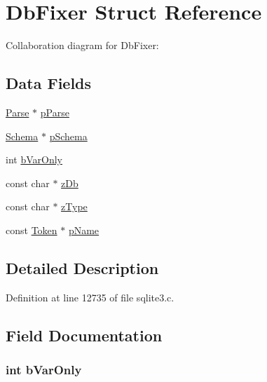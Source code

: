 \hypertarget{struct_db_fixer}{}\section{Db\+Fixer Struct Reference}
\label{struct_db_fixer}


Collaboration diagram for Db\+Fixer\+:
\subsection*{Data Fields}
\begin{DoxyCompactItemize}
\item 
\hyperlink{struct_parse}{Parse} $\ast$ \hyperlink{struct_db_fixer_ac700bf257b32cd7e491fde90a081379d}{p\+Parse}
\item 
\hyperlink{struct_schema}{Schema} $\ast$ \hyperlink{struct_db_fixer_ac262c2ca980f0326edbe82bbe7fda205}{p\+Schema}
\item 
int \hyperlink{struct_db_fixer_ac0eca6c4f9917dc34ccc5a56a17f50cc}{b\+Var\+Only}
\item 
const char $\ast$ \hyperlink{struct_db_fixer_a272f317b6ecb89050b56c561e960e1aa}{z\+Db}
\item 
const char $\ast$ \hyperlink{struct_db_fixer_ae215e2599893c4ca8ed6670cbf1608cf}{z\+Type}
\item 
const \hyperlink{struct_token}{Token} $\ast$ \hyperlink{struct_db_fixer_a69fdc3bf044a0650328c28e0410cc6f5}{p\+Name}
\end{DoxyCompactItemize}


\subsection{Detailed Description}


Definition at line 12735 of file sqlite3.\+c.



\subsection{Field Documentation}
\hypertarget{struct_db_fixer_ac0eca6c4f9917dc34ccc5a56a17f50cc}{}
\subsubsection[{b\+Var\+Only}]{\setlength{\rightskip}{0pt plus 5cm}int b\+Var\+Only}\label{struct_db_fixer_ac0eca6c4f9917dc34ccc5a56a17f50cc}


